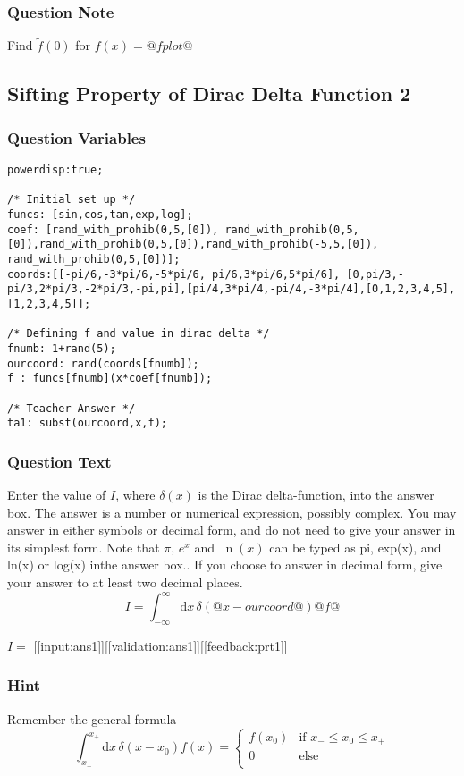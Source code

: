 \documentclass[a4paper,10pt]{article}
\begin{document}
\subsubsection{Question Note}
Find \(\tilde{f}(0)\) for $f(x) = @fplot@$

\subsection{Sifting Property of Dirac Delta Function 2}
\subsubsection{Question Variables}
\begin{lstlisting}
powerdisp:true;

/* Initial set up */
funcs: [sin,cos,tan,exp,log];
coef: [rand_with_prohib(0,5,[0]), rand_with_prohib(0,5,[0]),rand_with_prohib(0,5,[0]),rand_with_prohib(-5,5,[0]), rand_with_prohib(0,5,[0])];
coords:[[-pi/6,-3*pi/6,-5*pi/6, pi/6,3*pi/6,5*pi/6], [0,pi/3,-pi/3,2*pi/3,-2*pi/3,-pi,pi],[pi/4,3*pi/4,-pi/4,-3*pi/4],[0,1,2,3,4,5], [1,2,3,4,5]];

/* Defining f and value in dirac delta */
fnumb: 1+rand(5);
ourcoord: rand(coords[fnumb]);
f : funcs[fnumb](x*coef[fnumb]);

/* Teacher Answer */
ta1: subst(ourcoord,x,f);
\end{lstlisting}
\subsubsection{Question Text}
Enter the value of \(I\), where \(\delta(x)\) is the Dirac delta-function, into the answer box. The answer is a number or numerical expression, possibly complex. You may answer in either symbols or decimal form, and do not need to give your answer in its simplest form. Note that \(\pi\), \(e^{x}\) and \(\ln(x)\) can be typed as pi, exp(x), and ln(x) or log(x) inthe answer box.. If you choose to answer in decimal form, give your answer to at least two decimal places. \[ I = \int_{-\infty}^{\infty} \text{d}x \, \delta\left(@x-ourcoord@\right)@f@ \]

\(I = \) [[input:ans1]][[validation:ans1]][[feedback:prt1]]
\subsubsection{Hint}
Remember the general formula \[ \int_{x_{-}}^{x_{+}} \text{d}x \, \delta\left(x-x_0\right)f(x) = \begin{cases} f(x_0) & \text{if } x_{-}\leq x_{0} \leq x_{+} \\ 0 & \text{else} \\ \end{cases} \]
\end{document}
